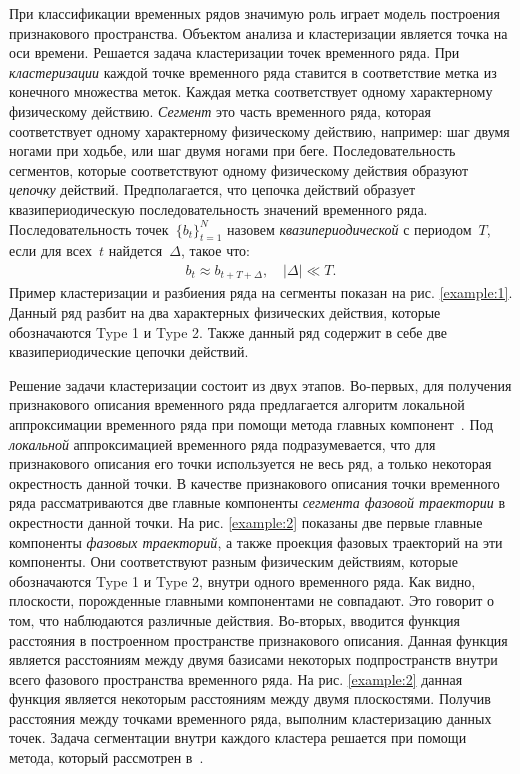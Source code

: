При классификации временных рядов значимую роль играет модель построения признакового пространства.
Объектом анализа и кластеризации является точка на оси времени. 
Решается задача кластеризации точек временного ряда. 
При \textit{кластеризации} каждой точке временного ряда ставится в соответствие метка из конечного множества меток. 
Каждая метка соответствует одному характерному физическому действию. \textit{Сегмент} это часть временного ряда, которая соответствует одному характерному физическому действию, например: шаг двумя ногами при ходьбе, или шаг двумя ногами при беге.
Последовательность сегментов, которые соответствуют одному физическому действия образуют \textit{цепочку} действий. 
Предполагается, что цепочка действий образует квазипериодическую последовательность значений временного ряда.
Последовательность точек~$\{b_t\}_{t=1}^{N}$ назовем \textit{квазипериодической} с периодом~$T$, если для всех~$t$ найдется~$\Delta$, такое что:
\[
\label{eq:int:1}
\begin{aligned}
b_t \approx b_{t+T+\Delta}, \quad \left|\Delta\right| \ll T.
\end{aligned}
\]
Пример кластеризации и разбиения ряда на сегменты показан на рис. \ref{example:1}. Данный ряд разбит на два характерных физических действия, которые обозначаются Type 1 и Type 2. Также данный ряд содержит в себе две квазипериодические цепочки действий.

Решение задачи кластеризации состоит из двух этапов. 
Во-первых, для получения признакового описания временного ряда предлагается алгоритм локальной аппроксимации временного ряда при помощи метода главных компонент~\cite{Shiglavsi1997}. 
Под \textit{локальной} аппроксимацией временного ряда подразумевается, что для признакового описания его точки используется не весь ряд, а только некоторая окрестность данной точки. 
В качестве признакового описания точки временного ряда рассматриваются две главные компоненты \textit{сегмента фазовой траектории} в окрестности данной точки.
На рис. \ref{example:2} показаны две первые главные компоненты \textit{фазовых траекторий}, а также проекция фазовых траекторий на эти компоненты.
Они соответствуют разным физическим действиям, которые обозначаются Type 1 и Type 2, внутри одного временного ряда.
Как видно, плоскости, порожденные главными компонентами не совпадают. 
Это говорит о том, что наблюдаются различные действия. 
Во-вторых, вводится функция расстояния в построенном пространстве признакового описания. 
Данная функция является расстояниям между двумя базисами некоторых подпространств внутри всего фазового пространства временного ряда.
На рис. \ref{example:2} данная функция является некоторым расстояниям между двумя плоскостями.
Получив расстояния между точками временного ряда, выполним кластеризацию данных точек.
Задача сегментации внутри каждого кластера решается при помощи метода, который рассмотрен в~\cite{motrenko2015}.

